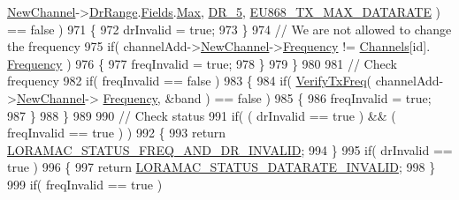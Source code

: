 \begin{DoxyCode}
      \mbox{\hyperlink{structs_channel_add_params_afc31493a105479490228fd896b20b45c}{NewChannel}}->\mbox{\hyperlink{structs_channel_params_ad4d9b041ea740886a05fa8a1d06997a2}{DrRange}}.\mbox{\hyperlink{unionu_dr_range_a5bdb9afc17112f2ae5f9548f0aee964f}{Fields}}.\mbox{\hyperlink{structu_dr_range_1_1s_fields_a5d03c6d792ca60d11ffc7e7a2cb59dd0}{Max}}, \mbox{\hyperlink{group___r_e_g_i_o_n_ga872e12c82020c02a7f70a1c6ed1375df}{DR\_5}}, 
      \mbox{\hyperlink{group___r_e_g_i_o_n_e_u868_ga689495f3ecc7047ff636ec85b3b80ee3}{EU868\_TX\_MAX\_DATARATE}} ) == \textcolor{keyword}{false} )
971         \{
972             drInvalid = \textcolor{keyword}{true};
973         \}
974         \textcolor{comment}{// We are not allowed to change the frequency}
975         \textcolor{keywordflow}{if}( channelAdd->\mbox{\hyperlink{structs_channel_add_params_afc31493a105479490228fd896b20b45c}{NewChannel}}->\mbox{\hyperlink{structs_channel_params_ade3d190636488dad9a89b19446b7acf1}{Frequency}} != \mbox{\hyperlink{_region_e_u868_8c_a2f381382b4cbbe721da7b980ec467229}{Channels}}[\textcolor{keywordtype}{id}].
      \mbox{\hyperlink{structs_channel_params_ade3d190636488dad9a89b19446b7acf1}{Frequency}} )
976         \{
977             freqInvalid = \textcolor{keyword}{true};
978         \}
979     \}
980 
981     \textcolor{comment}{// Check frequency}
982     \textcolor{keywordflow}{if}( freqInvalid == \textcolor{keyword}{false} )
983     \{
984         \textcolor{keywordflow}{if}( \mbox{\hyperlink{_region_e_u868_8c_a827497ee67461abdb257e1ff3f7e78e6}{VerifyTxFreq}}( channelAdd->\mbox{\hyperlink{structs_channel_add_params_afc31493a105479490228fd896b20b45c}{NewChannel}}->
      \mbox{\hyperlink{structs_channel_params_ade3d190636488dad9a89b19446b7acf1}{Frequency}}, &band ) == \textcolor{keyword}{false} )
985         \{
986             freqInvalid = \textcolor{keyword}{true};
987         \}
988     \}
989 
990     \textcolor{comment}{// Check status}
991     \textcolor{keywordflow}{if}( ( drInvalid == \textcolor{keyword}{true} ) && ( freqInvalid == \textcolor{keyword}{true} ) )
992     \{
993         \textcolor{keywordflow}{return} \mbox{\hyperlink{group___l_o_r_a_m_a_c_gga1d18f26b344040b3ec5c3db662919661a163a1a739baee13607068af42f2e9d30}{LORAMAC\_STATUS\_FREQ\_AND\_DR\_INVALID}};
994     \}
995     \textcolor{keywordflow}{if}( drInvalid == \textcolor{keyword}{true} )
996     \{
997         \textcolor{keywordflow}{return} \mbox{\hyperlink{group___l_o_r_a_m_a_c_gga1d18f26b344040b3ec5c3db662919661aa910e51ef7a7cf64c27dd3ffe5eb9d38}{LORAMAC\_STATUS\_DATARATE\_INVALID}};
998     \}
999     \textcolor{keywordflow}{if}( freqInvalid == \textcolor{keyword}{true} )

\end{DoxyCode}
